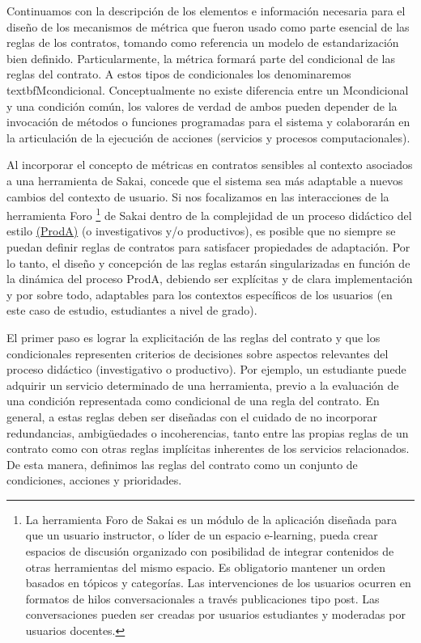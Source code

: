 \begin{itemize}
Continuamos con la descripción de los elementos e información necesaria para el diseño de los mecanismos de métrica que fueron usado como parte esencial de las reglas de los contratos, tomando como referencia un modelo de estandarización bien definido. Particularmente, la métrica formará parte del condicional de las reglas del contrato. A estos tipos de condicionales los denominaremos textbf{Mcondicional}. Conceptualmente no existe diferencia entre un Mcondicional y una condición común, los valores de verdad de ambos pueden depender de la invocación de métodos o funciones programadas para el sistema y colaborarán en la articulación de la ejecución de acciones (servicios y procesos computacionales). 

Al incorporar el concepto de métricas en contratos sensibles al contexto asociados a una herramienta de Sakai, concede que el sistema sea más adaptable a nuevos cambios del contexto de usuario. Si nos focalizamos en las interacciones de la herramienta Foro \footnote{La herramienta Foro de Sakai es un módulo de la aplicación diseñada para que un usuario instructor, o líder de un espacio e-learning, pueda crear espacios de discusión organizado con posibilidad de integrar contenidos de otras herramientas del mismo espacio. Es obligatorio mantener un orden basados en tópicos y categorías. Las intervenciones de los usuarios ocurren en formatos de hilos conversacionales a través publicaciones tipo post. Las conversaciones pueden ser creadas por usuarios estudiantes y moderadas por usuarios docentes.} de Sakai dentro de la complejidad de un proceso didáctico del estilo \hyperref[ProdA]{(ProdA)} (o investigativos y/o productivos), es posible que no siempre se puedan definir reglas de contratos para satisfacer propiedades de adaptación. Por lo tanto, el diseño y concepción de las reglas estarán singularizadas en función de la dinámica del proceso ProdA, debiendo ser explícitas y de clara implementación y por sobre todo, adaptables para los contextos específicos de los usuarios (en este caso de estudio, estudiantes a nivel de grado).


El primer paso es lograr la explicitación de las reglas del contrato y que los condicionales representen criterios de decisiones sobre aspectos relevantes del proceso didáctico (investigativo o productivo). Por ejemplo, un estudiante puede adquirir un servicio determinado de una herramienta, previo a la evaluación de una condición representada como condicional de una regla del contrato. En general, a estas reglas deben ser diseñadas con el cuidado de no incorporar
redundancias, ambigüedades o incoherencias, tanto entre las propias reglas de un contrato como con otras reglas implícitas inherentes de los servicios relacionados. De esta manera, definimos las reglas del contrato como un conjunto de condiciones, acciones y prioridades.


\end{itemize}
